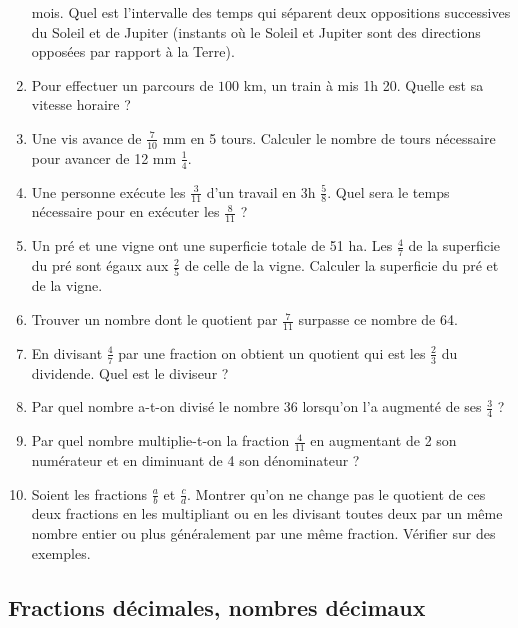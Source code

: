\documentclass[12 pt]{extarticle}
\theoremstyle{plain}
\begin{document}
\begin{enumerate}
 mois. Quel est l'intervalle des temps qui séparent deux oppositions successives du Soleil et de Jupiter (instants où le Soleil et Jupiter sont des directions opposées par rapport à la Terre). 
 \item Pour effectuer un parcours de $100$ km, un train à mis 1h 20. Quelle
 est sa vitesse horaire ? 
 \item Une vis avance de $\frac7{10}$ mm en 5 tours. Calculer le nombre de
 tours nécessaire pour avancer de 12 mm $\frac14$. 
 \item Une personne exécute les $\frac{3}{11}$ d'un travail en 3h $\frac58$.
 Quel sera le temps nécessaire pour en exécuter les $\frac8{11}$ ? 
 \item Un pré et une vigne ont une superficie totale de 51 ha. Les $\frac47$ de
 la superficie du pré sont égaux aux $\frac25$ de celle de la vigne. Calculer 
 la superficie du pré et de la vigne. 
 \item Trouver un nombre dont le quotient par $\frac7{11}$ surpasse ce nombre
 de 64. 
 \item En divisant $\frac47$ par une fraction on obtient un quotient qui est
 les $\frac23$ du dividende. Quel est le diviseur ? 
 \item Par quel nombre a-t-on divisé le nombre 36 lorsqu'on l'a augmenté de ses $\frac34$ ?
 \item Par quel nombre multiplie-t-on la fraction $\frac4{11}$ en augmentant
 de 2 son numérateur et en diminuant de 4 son dénominateur ? 
 \item Soient les fractions $\frac{a}b$ et $\frac{c}d$. Montrer qu'on ne change pas le quotient de ces deux fractions en les multipliant ou en les divisant toutes deux par un même nombre entier ou plus généralement par une même fraction. Vérifier sur des exemples. 
 
 \end{enumerate}
 
 \subsection{Fractions décimales, nombres décimaux}
 
\end{document}
